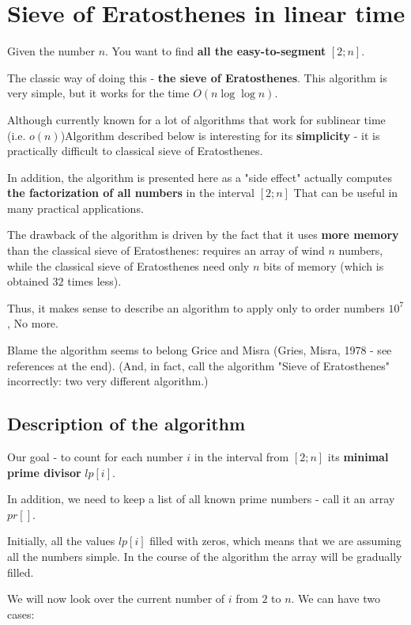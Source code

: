 \section{ Sieve of Eratosthenes in linear time }
Given the number $n$. You want to find \textbf{all the easy-to-segment} $[2; n]$.

The classic way of doing this - \textbf{the sieve of Eratosthenes}. This algorithm is very simple, but it works for the time $O (n \log \log n)$.

Although currently known for a lot of algorithms that work for sublinear time (i.e. $o (n)$)Algorithm described below is interesting for its \textbf{simplicity} - it is practically difficult to classical sieve of Eratosthenes.

In addition, the algorithm is presented here as a "side effect" actually computes \textbf{the factorization of all numbers} in the interval $[2; n]$ That can be useful in many practical applications.

The drawback of the algorithm is driven by the fact that it uses \textbf{more memory} than the classical sieve of Eratosthenes: requires an array of wind $n$ numbers, while the classical sieve of Eratosthenes need only $n$ bits of memory (which is obtained $32$ times less).

Thus, it makes sense to describe an algorithm to apply only to order numbers $10 ^ 7$, No more.

Blame the algorithm seems to belong Grice and Misra (Gries, Misra, 1978 - see references at the end). (And, in fact, call the algorithm "Sieve of Eratosthenes" incorrectly: two very different algorithm.)

\subsection{ Description of the algorithm }

Our goal - to count for each number $i$ in the interval from $[2; n]$ its \textbf{minimal prime divisor} $lp [i]$.

In addition, we need to keep a list of all known prime numbers - call it an array $pr []$.

Initially, all the values $lp [i]$ filled with zeros, which means that we are assuming all the numbers simple. In the course of the algorithm the array will be gradually filled.

We will now look over the current number of $i$ from $2$ to $n$. We can have two cases:

